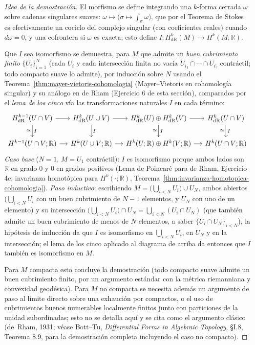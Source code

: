 \documentclass[11pt,a4paper]{article}
\theoremstyle{plain}
\theoremstyle{definition}
\theoremstyle{remark}
\newcommand{\RR}{\mathbb R}
\begin{document}
\begin{proof}[Idea de la demostración]
El morfismo se define integrando una $k$-forma cerrada $\omega$ sobre
cadenas singulares suaves: $\omega\mapsto\big(\sigma\mapsto\int_\sigma\omega\big)$,
que por el Teorema de Stokes es efectivamente un cociclo del complejo
singular (con coeficientes reales) cuando $d\omega=0$, y una cofrontera
si $\omega$ es exacta; esto define
$I:H^k_{\mathrm{dR}}(M)\to H^k(M;\RR)$.

Que $I$ sea isomorfismo se demuestra, para $M$ que admite un \emph{buen
cubrimiento finito} $\{U_i\}_{i=1}^N$ (cada $U_i$ y cada intersección
finita no vacía $U_{i_1}\cap\cdots\cap U_{i_r}$ contráctil; todo
compacto suave lo admite), por inducción sobre $N$ usando el
Teorema~\ref{thm:mayer-vietoris-cohomologia} (Mayer--Vietoris en
cohomología singular) y su análogo en de Rham (Ejercicio 6 de esta
sección), comparados por el \emph{lema de los cinco} vía las
transformaciones naturales $I$ en cada término:
\[
\begin{tikzcd}[column sep=small]
H^{k-1}_{\mathrm{dR}}(U\cap V) \arrow[r] \arrow[d,"I","\cong"'] & H^k_{\mathrm{dR}}(U\cup V) \arrow[r] \arrow[d,"I"] & H^k_{\mathrm{dR}}(U)\oplus H^k_{\mathrm{dR}}(V) \arrow[r] \arrow[d,"I","\cong"'] & H^k_{\mathrm{dR}}(U\cap V) \arrow[d,"I","\cong"'] \\
H^{k-1}(U\cap V;\RR) \arrow[r] & H^k(U\cup V;\RR) \arrow[r] & H^k(U;\RR)\oplus H^k(V;\RR) \arrow[r] & H^k(U\cap V;\RR)
\end{tikzcd}
\]
\emph{Caso base} ($N=1$, $M=U_1$ contráctil): $I$ es isomorfismo porque
ambos lados son $\RR$ en grado $0$ y $0$ en grados positivos (Lema de
Poincaré para de Rham, Ejercicio 4e; invarianza homotópica para
$H^k(\cdot;\RR)$, Teorema~\ref{thm:invarianza-homotopica-cohomologia}).
\emph{Paso inductivo}: escribiendo $M=\big(\bigcup_{i<N}U_i\big)\cup U_N$,
ambos abiertos ($\bigcup_{i<N}U_i$ con un buen cubrimiento de $N-1$
elementos, y $U_N$ con uno de un elemento) y su intersección
$\big(\bigcup_{i<N}U_i\big)\cap U_N=\bigcup_{i<N}(U_i\cap U_N)$ (que
también admite un buen cubrimiento de menos de $N$ elementos, a saber
$\{U_i\cap U_N\}_{i<N}$), la hipótesis de inducción da que $I$ es
isomorfismo en $\bigcup_{i<N}U_i$, en $U_N$ y en la intersección; el
lema de los cinco aplicado al diagrama de arriba da entonces que $I$
también es isomorfismo en $M$.

Para $M$ compacta esto concluye la demostración (todo compacto suave
admite un buen cubrimiento finito, por un argumento estándar con la
métrica riemanniana y convexidad geodésica). Para $M$ no compacta se
necesita además un argumento de paso al límite directo sobre una
exhaución por compactos, o el uso de cubrimientos buenos numerables
localmente finitos junto con particiones de la unidad subordinadas; esto
no se detalla aquí y se cita como el argumento clásico (de~Rham, 1931;
véase Bott--Tu, \emph{Differential Forms in Algebraic Topology}, \S I.8,
Teorema 8.9, para la demostración completa incluyendo el caso no
compacto).
\end{proof}
\end{document}
